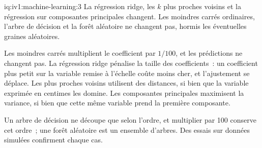 \begin{solution}{iq:iv1:machine-learning:3}
La régression ridge, les $k$ plus proches voisins et la régression sur composantes principales changent. Les moindres carrés ordinaires, l'arbre de décision et la forêt aléatoire ne changent pas, hormis les éventuelles graines aléatoires.

Les moindres carrés multiplient le coefficient par $1/100$, et les prédictions ne changent pas. La régression ridge pénalise la taille des coefficients~: un coefficient plus petit sur la variable remise à l'échelle coûte moins cher, et l'ajustement se déplace. Les plus proches voisins utilisent des distances, si bien que la variable exprimée en centimes les domine. Les composantes principales maximisent la variance, si bien que cette même variable prend la première composante.

Un arbre de décision ne découpe que selon l'ordre, et multiplier par 100 conserve cet ordre~; une forêt aléatoire est un ensemble d'arbres. Des essais sur données simulées confirment chaque cas.



\end{solution}

